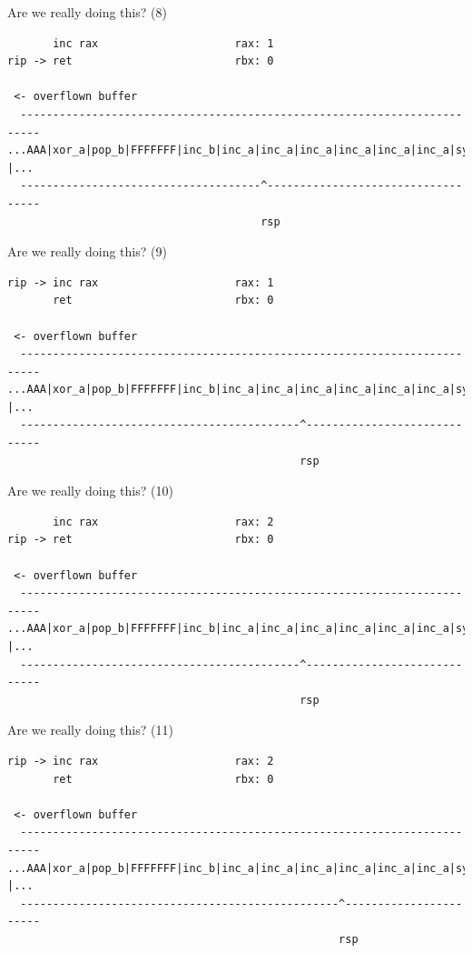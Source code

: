 \documentclass[9pt,aspectratio=169]{beamer}
\begin{document}
\begin{frame}[label={sec:org4671b21},fragile]{Are we really doing this? (8)}
 \begin{verbatim}
       inc rax                     rax: 1
rip -> ret                         rbx: 0

 <- overflown buffer 
  -------------------------------------------------------------------------
...AAA|xor_a|pop_b|FFFFFFF|inc_b|inc_a|inc_a|inc_a|inc_a|inc_a|inc_a|sys |...
  -------------------------------------^-----------------------------------
                                       rsp
\end{verbatim}
\end{frame}
\begin{frame}[label={sec:orgdd7c553},fragile]{Are we really doing this? (9)}
 \begin{verbatim}
rip -> inc rax                     rax: 1
       ret                         rbx: 0

 <- overflown buffer 
  -------------------------------------------------------------------------
...AAA|xor_a|pop_b|FFFFFFF|inc_b|inc_a|inc_a|inc_a|inc_a|inc_a|inc_a|sys |...
  -------------------------------------------^-----------------------------
                                             rsp
\end{verbatim}
\end{frame}
\begin{frame}[label={sec:org4c306dd},fragile]{Are we really doing this? (10)}
 \begin{verbatim}
       inc rax                     rax: 2
rip -> ret                         rbx: 0

 <- overflown buffer 
  -------------------------------------------------------------------------
...AAA|xor_a|pop_b|FFFFFFF|inc_b|inc_a|inc_a|inc_a|inc_a|inc_a|inc_a|sys |...
  -------------------------------------------^-----------------------------
                                             rsp
\end{verbatim}
\end{frame}
\begin{frame}[label={sec:org8b55925},fragile]{Are we really doing this? (11)}
 \begin{verbatim}
rip -> inc rax                     rax: 2
       ret                         rbx: 0

 <- overflown buffer 
  -------------------------------------------------------------------------
...AAA|xor_a|pop_b|FFFFFFF|inc_b|inc_a|inc_a|inc_a|inc_a|inc_a|inc_a|sys |...
  -------------------------------------------------^-----------------------
                                                   rsp
\end{verbatim}
\end{frame}
\end{document}
